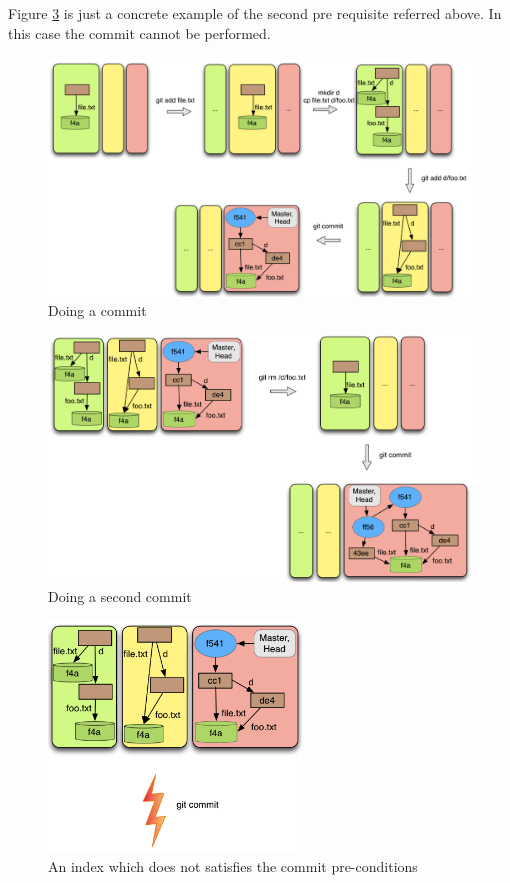 Figure \ref{fig:commit_pre} is just a concrete example of the second pre requisite
referred above. In this case the commit cannot be performed.\\

\begin{figure}[hp]
   \centering
   \includegraphics[width=1.2\textwidth]{images/commit1.png}
   \caption{Doing a commit}\label{fig:commit1}
\end{figure}
\begin{figure}[hp]
   \centering
   \includegraphics[width=1.2\textwidth]{images/commit2.png}
   \caption{Doing a second commit}\label{fig:commit2}
\end{figure}

\begin{figure}[tp]
   \centering
   \includegraphics[width=0.6\textwidth]{images/commit_pre.png}
   \caption{An index which does not satisfies the commit
   pre-conditions}\label{fig:commit_pre}
\end{figure}

